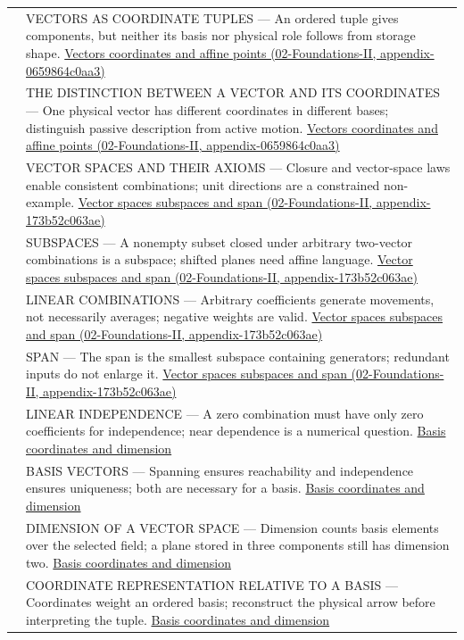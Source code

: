 {\begin{longtable}[]{@{}
  >{\raggedright\arraybackslash}p{}
  >{\raggedright\arraybackslash}p{}@{}}
505 & VECTORS AS COORDINATE TUPLES --- An ordered tuple gives components, but neither its basis nor physical role follows from storage shape. \href{}{Vectors coordinates and affine points (02-Foundations-II, appendix-0659864c0aa3)} \\
506 & THE DISTINCTION BETWEEN A VECTOR AND ITS COORDINATES --- One physical vector has different coordinates in different bases; distinguish passive description from active motion. \href{}{Vectors coordinates and affine points (02-Foundations-II, appendix-0659864c0aa3)} \\
507 & VECTOR SPACES AND THEIR AXIOMS --- Closure and vector-space laws enable consistent combinations; unit directions are a constrained non-example. \href{}{Vector spaces subspaces and span (02-Foundations-II, appendix-173b52c063ae)} \\
508 & SUBSPACES --- A nonempty subset closed under arbitrary two-vector combinations is a subspace; shifted planes need affine language. \href{}{Vector spaces subspaces and span (02-Foundations-II, appendix-173b52c063ae)} \\
509 & LINEAR COMBINATIONS --- Arbitrary coefficients generate movements, not necessarily averages; negative weights are valid. \href{}{Vector spaces subspaces and span (02-Foundations-II, appendix-173b52c063ae)} \\
510 & SPAN --- The span is the smallest subspace containing generators; redundant inputs do not enlarge it. \href{}{Vector spaces subspaces and span (02-Foundations-II, appendix-173b52c063ae)} \\
511 & LINEAR INDEPENDENCE --- A zero combination must have only zero coefficients for independence; near dependence is a numerical question. \hyperref[appendix-ce0341f7ea0d]{Basis coordinates and dimension} \\
512 & BASIS VECTORS --- Spanning ensures reachability and independence ensures uniqueness; both are necessary for a basis. \hyperref[appendix-ce0341f7ea0d]{Basis coordinates and dimension} \\
513 & DIMENSION OF A VECTOR SPACE --- Dimension counts basis elements over the selected field; a plane stored in three components still has dimension two. \hyperref[appendix-ce0341f7ea0d]{Basis coordinates and dimension} \\
514 & COORDINATE REPRESENTATION RELATIVE TO A BASIS --- Coordinates weight an ordered basis; reconstruct the physical arrow before interpreting the tuple. \hyperref[appendix-ce0341f7ea0d]{Basis coordinates and dimension} \\

\end{longtable}}
